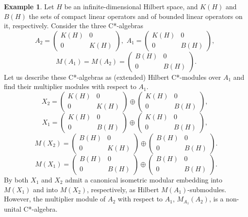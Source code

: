 \documentclass{amsart}
\theoremstyle{definition}
\newtheorem{ex}[thm]{Example}
\begin{document}
\begin{ex}
Let $H$ be an infinite-dimensional Hilbert space, and $K(H)$ and $B(H)$ the sets of compact linear operators and of bounded linear operators on it, respectively.  Consider the three C*-algebras
\[
   A_2 = \left(  \begin{array}{cc}  K(H) & 0 \\ 0 & K(H) \end{array} \right) , \,\,
   A_1 = \left(  \begin{array}{cc}  K(H) & 0 \\ 0 & B(H) \end{array} \right) , \,\,
\]
\[
   M(A_1) = M(A_2) = \left(  \begin{array}{cc}  B(H) & 0 \\ 0 & B(H) \end{array} \right) .
\]
Let us describe these C*-algebras as (extended) Hilbert C*-modules over $A_1$ and find their multiplier modules with respect to $A_1$.
\[
   X_2 =  \left(  \begin{array}{cc}  K(H) & 0 \\ 0 & K(H) \end{array} \right) \oplus \left(  \begin{array}{cc}  K(H) & 0 \\ 0 & B(H) \end{array} \right), \,\,
\]
\[
   X_1 =  \left(  \begin{array}{cc}  K(H) & 0 \\ 0 & B(H) \end{array} \right) \oplus \left(  \begin{array}{cc}  K(H) & 0 \\ 0 & B(H) \end{array} \right), \,\,
\]
\[
   M(X_2) = \left(  \begin{array}{cc}  B(H) & 0 \\ 0 & K(H) \end{array} \right) \oplus \left(  \begin{array}{cc}  B(H) & 0 \\ 0 & B(H) \end{array} \right) .
\]
\[
   M(X_1) = \left(  \begin{array}{cc}  B(H) & 0 \\ 0 & B(H) \end{array} \right) \oplus \left(  \begin{array}{cc}  B(H) & 0 \\ 0 & B(H) \end{array} \right) .
\]
By \cite[Prop.~1.1]{RT2002} both $X_1$ and $X_2$ admit a canonical isometric modular embedding into $M(X_1)$ and into $M(X_2)$, respectively, as Hilbert $M(A_1)$-submodules.  However, the multiplier module of $A_2$ with respect to $A_1$, $M_{A_1}(A_2)$, is a non-unital C*-algebra. 


\end{ex}
\end{document}
